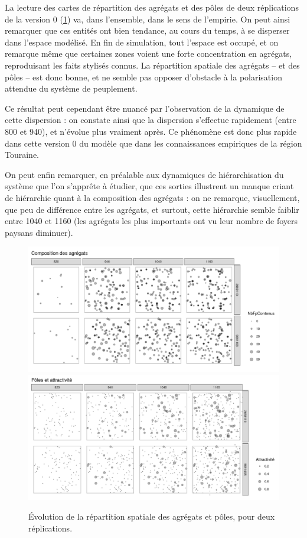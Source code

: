 \begin{mdframed}[backgroundcolor=gray!10,footnoteinside=false]
	La lecture des cartes de répartition des agrégats et des pôles de deux réplications de la version 0 (\cref{fig:cartes-agregats-v0}) va, dans l'ensemble, dans le sens de l'empirie. On peut ainsi remarquer que ces entités ont bien tendance, au cours du temps, à se disperser dans l'espace modélisé. En fin de simulation, tout l'espace est occupé, et on remarque même que certaines zones voient une forte concentration en agrégats, reproduisant les faits stylisés connus. La répartition spatiale des agrégats -- et des pôles -- est donc bonne, et ne semble pas opposer d'obstacle à la polarisation attendue du système de peuplement.
	
	Ce résultat peut cependant être nuancé par l'observation de la dynamique de cette dispersion : on constate ainsi que la dispersion s'effectue rapidement (entre 800 et 940), et n'évolue plus vraiment après. Ce phénomène est donc plus rapide dans cette version 0 du modèle que dans les connaissances empiriques de la région Touraine.
	
	On peut enfin remarquer, en préalable aux dynamiques de hiérarchisation du système que l'on s'apprête à étudier, que ces sorties illustrent un manque criant de hiérarchie quant à la composition des agrégats : on ne remarque, visuellement, que peu de différence entre les agrégats, et surtout, cette hiérarchie semble faiblir entre 1040 et 1160 (les agrégats les plus importants ont vu leur nombre de foyers paysans diminuer).
\end{mdframed}

\begin{figure}[H]
	\captionsetup{width=\linewidth}
	\includegraphics[width=.47\linewidth]{img/resultats/v0_cartes_agregats.pdf}
	\includegraphics[width=.47\linewidth]{img/resultats/v0_cartes_poles.pdf}
	\caption{Évolution de la répartition spatiale des agrégats et pôles, pour deux réplications.} 
	\label{fig:cartes-agregats-v0} 
\end{figure}

